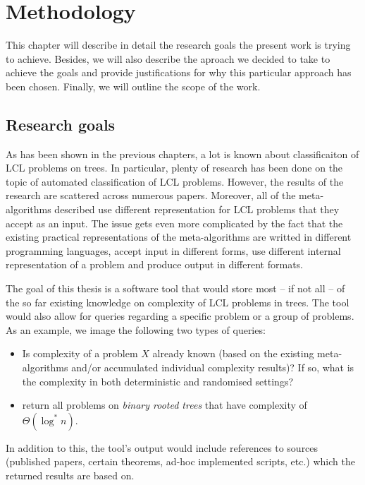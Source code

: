 \chapter{Methodology}
\label{chapter:methods}

This chapter will describe in detail the research goals the present work
is trying to achieve. Besides, we will also describe the aproach we decided
to take to achieve the goals and provide justifications for why this particular
approach has been chosen. Finally, we will outline the scope of the work.

\section{Research goals}

As has been shown in the previous chapters, a lot is known about classificaiton
of LCL problems on trees. In particular, plenty of research has been done
on the topic of automated classification of LCL problems. However, the
results of the research are scattered across numerous papers. Moreover,
all of the meta-algorithms described use different representation for LCL
problems that they accept as an input.
The issue gets even more complicated by the fact that the existing practical representations
of the meta-algorithms are writted in different programming languages, accept input in
different forms,
use different internal representation of a problem and produce output in different
formats.

The goal of this thesis is a software tool that would store most -- if not all -- of
the so far existing knowledge on complexity of LCL problems in trees.
The tool would also allow for queries regarding a specific problem or a group of
problems. As an example, we image the following two types of queries:
\begin{itemize}
  \item Is complexity of a problem $X$ already known (based on the existing meta-algorithms
  and/or accumulated individual complexity results)? If so, what is the complexity in both
  deterministic and randomised settings?
  \item return all problems on \emph{binary rooted trees} that have complexity of
  $\Theta(\log^* n)$.
\end{itemize}
In addition to this, the tool’s output would include references to sources
(published papers, certain theorems, ad-hoc implemented scripts, etc.)
which the returned results are based on.

